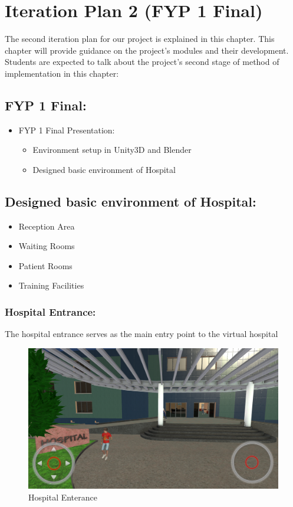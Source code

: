 \chapter{Iteration Plan 2 (FYP 1 Final)}
\label{ch:iter2}

The second iteration plan for our project is explained in this chapter. This chapter will provide guidance on the project’s modules and their development. Students are expected to talk about the project’s second stage of method of implementation in this chapter:

\section{FYP 1 Final:}
\begin{itemize}
    \item FYP 1 Final Presentation: \begin{itemize}
    \item Environment setup in Unity3D and Blender 
    \item Designed basic environment of Hospital
    \end{itemize}
\end{itemize}

\section{Designed basic environment of Hospital:}
	\begin{itemize}
	\item Reception Area
	\item Waiting Rooms
	\item Patient Rooms
	\item Training Facilities
\end{itemize}	
	
\subsection{Hospital Entrance:}
The hospital entrance serves as the main entry point to the virtual hospital
	\begin{figure}[h]
		\centering
		\includegraphics[width=0.7\linewidth]{Images/Hospital Enterance.png}
		\caption{Hospital Enterance}
		\label{fig:system-diagram}
	\end{figure}
\newline

